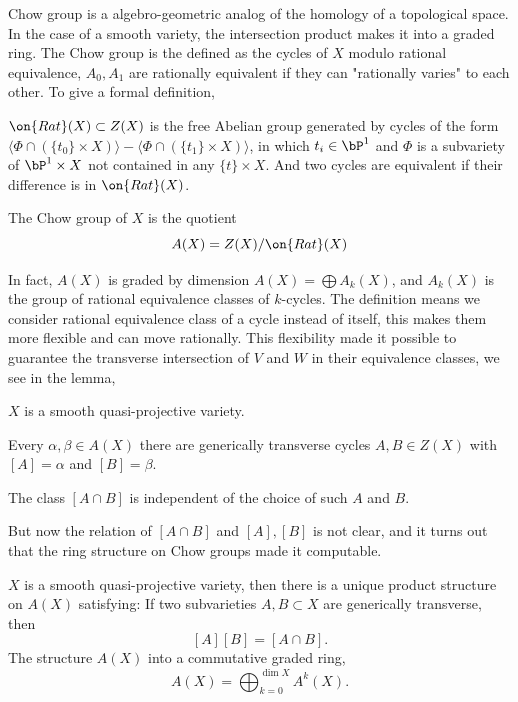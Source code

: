 \documentclass[a4paper, twoside]{article}
\begin{document}
 Chow group is a algebro-geometric analog of the homology of a topological space. In the case of a smooth variety, the intersection product makes it into a graded ring. The Chow group is the defined as the cycles of $X$ modulo rational equivalence, $A_0,A_1$ are rationally equivalent if they can "rationally varies" to each other. To give a formal definition,
\begin{dfn}
	$\on{Rat}(X)\subset Z(X)$ is the free Abelian group generated by cycles of the form
	$\langle\Phi\cap(\{t_0\}\times X)\rangle-\langle\Phi\cap(\{t_1\}\times X)\rangle$, in which $t_i\in\bP^1$ and $\Phi$ is a subvariety of $\bP^1\times X$ not contained in any $\{t\}\times X$. And two cycles are equivalent if their difference is in $\on{Rat}(X)$.
\end{dfn}

\begin{dfn}
	The Chow group of $X$ is the quotient
	$$
	A(X)=Z(X)/\on{Rat}(X)
	$$
\end{dfn}
In fact, $A(X)$ is graded by dimension $A(X)=\bigoplus A_k(X)$, and $A_k(X)$ is the group of rational equivalence classes of $k$-cycles. The definition means we consider rational equivalence class of a cycle instead of itself, this makes them more flexible and can move rationally. This flexibility made it possible to guarantee the transverse intersection of $V$ and $W$ in their equivalence classes, we see in the lemma,
\begin{lem}
	$X$ is a smooth quasi-projective variety.
	\begin{itm}
		\item Every $\alpha,\beta\in A(X)$ there are generically transverse cycles $A,B\in Z(X)$ with $[A]=\alpha$ and $[B]=\beta$.
		\item The class $[A\cap B]$ is independent of the choice of such $A$ and $B$.
	\end{itm}
\end{lem}

But now the relation of $[A\cap B]$ and $[A],[B]$ is not clear, and it turns out that the ring structure on Chow groups made it computable.
\begin{thm}
	$X$ is a smooth quasi-projective variety, then there is a unique product structure on $A(X)$ satisfying: If two subvarieties $A,B\subset X$ are generically transverse, then
	$$
	[A][B]=[A\cap B].
	$$
	The structure $A(X)$ into a commutative graded ring,
	$$
	A(X)=\bigoplus_{k=0}^{\dim X}A^k(X).
	$$
\end{thm}
\end{document}
